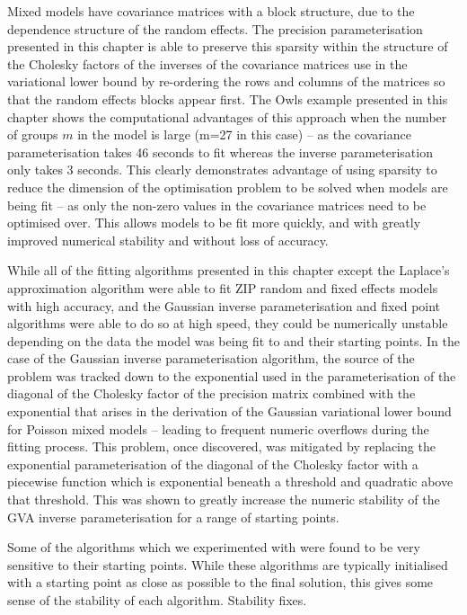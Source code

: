 Mixed models have covariance matrices with a block structure, due to the dependence structure of the
random effects. The precision parameterisation presented in this chapter is able to preserve this
sparsity within the structure of the Cholesky factors of the inverses of the covariance matrices use in
the variational lower bound by re-ordering the rows and columns of the matrices so that the random
effects blocks appear first. The Owls example presented in this chapter shows the computational
advantages of this approach when the number of groups $m$ in the model is large (m=27 in this case) --
as the covariance parameterisation takes 46 seconds to fit whereas the inverse parameterisation only
takes 3 seconds. This clearly demonstrates advantage of using sparsity to reduce the dimension of the
optimisation problem to be solved when models are being fit -- as only the non-zero values in the
covariance matrices need to be optimised over. This allows models to be fit more quickly, and with
greatly improved numerical stability and without loss of accuracy.

While all of the fitting algorithms presented in this chapter except the Laplace's approximation
algorithm were able to fit ZIP random and fixed effects models with high accuracy, and the 
Gaussian inverse parameterisation and fixed point algorithms were able to do so at high speed, they 
could be numerically unstable depending on the data the model was being fit to and their starting points.
In the case of the Gaussian inverse parameterisation algorithm, the source of the problem was tracked down
to the exponential used in the parameterisation of the diagonal of the Cholesky factor of the precision
matrix combined with the exponential that arises in the derivation of the Gaussian variational lower
bound for Poisson mixed models -- leading to frequent numeric overflows during the fitting process. This
problem, once discovered, was mitigated by replacing the exponential parameterisation of the diagonal
of the Cholesky factor with a piecewise function which is exponential beneath a threshold and quadratic
above that threshold. This was shown to greatly increase the numeric stability of the GVA inverse
parameterisation for a range of starting points.

Some of the algorithms which we experimented with were found to be very sensitive to their starting points.
While these algorithms are typically initialised with a starting point as close as possible to the final
solution, this gives some sense of the stability of each algorithm.
Stability fixes.

